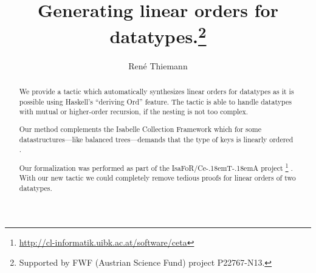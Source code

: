 \documentclass[11pt,a4paper]{article}
\newcommand\isafor{\textsf{IsaFoR}}
\newcommand\ceta{\textsf{Ce\kern-.18emT\kern-.18emA}}
\begin{document}
\title{Generating linear orders for datatypes.\footnote{Supported by FWF (Austrian Science Fund) project P22767-N13.}}
\author{Ren\'e Thiemann}
\maketitle

\begin{abstract}
  We provide a tactic which automatically synthesizes linear orders for datatypes
  as it is possible using Haskell's ``deriving Ord'' feature.
  The tactic is able to handle datatypes with mutual or higher-order recursion,
  if the nesting is not too complex. 

  Our method complements the Isabelle Collection Framework which for some 
  datastructures---like balanced trees---demands that the type of keys is 
  linearly ordered \cite{rbt}.
  
  Our formalization was performed as part of the \isafor/\ceta{} project%
  \footnote{\url{http://cl-informatik.uibk.ac.at/software/ceta}} \cite{CeTA}.
  With our new tactic we could completely remove 
  tedious proofs for linear orders of two datatypes.
\end{abstract}

\tableofcontents








\end{document}
